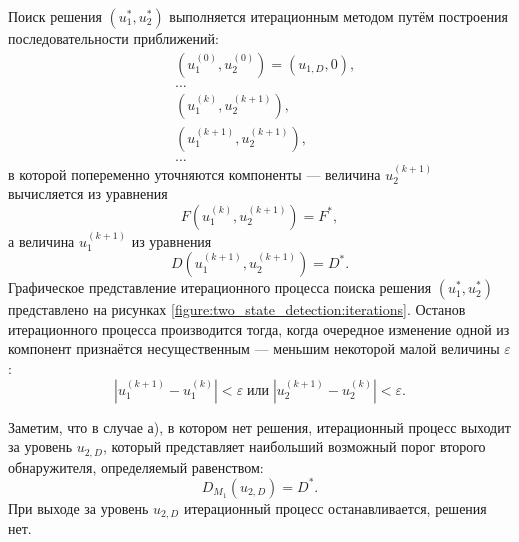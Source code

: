 \documentclass[a4paper,12pt]{article}
\newcommand{\modulus}[1]{\left | #1 \right |}
\begin{document}
    Поиск решения $\left (u_1^*, u_2^* \right )$ выполняется итерационным методом путём построения последовательности приближений:
    \begin{align*}
        & \left ( u_1^{(0)}   , u_2^{(0)} \right ) = \left ( u_{1,D}     , 0 \right ), \\
        & \dots \\
        & \left ( u_1^{(k)}   , u_2^{(k+1)} \right ), \\
        & \left ( u_1^{(k+1)} , u_2^{(k+1)} \right ), \\
        & \dots
    \end{align*}
    в которой попеременно уточняются компоненты --- величина $u_2^{(k+1)}$  вычисляется из уравнения
    \[
        F (u_1^{(k)}, u_2^{(k+1)}) = F^* ,
    \]
    а величина $u_1^{(k+1)}$ из уравнения
    \[
        D (u_1^{(k+1)}, u_2^{(k+1)}) = D^* .
    \]
    Графическое представление итерационного процесса поиска решения $\left ( u_1^*, u_2^* \right )$ представлено на рисунках \ref{figure:two_state_detection:iterations}.
    Останов итерационного процесса производится тогда, когда очередное изменение одной из компонент признаётся несущественным --- меньшим некоторой малой величины $\varepsilon$:
    \[
        \modulus{u_1^{(k+1)} - u_1^{(k)}} < \varepsilon \; \text{или} \; \modulus{u_2^{(k+1)} - u_2^{(k)}} < \varepsilon .
    \]


    Заметим, что в случае а), в котором нет решения, итерационный процесс выходит за уровень $u_{2,D}$, который представляет наибольший возможный порог второго обнаружителя,
    определяемый равенством:
    \[
        D_{M_1} ( u_{2,D} ) = D^* .
    \]
    При выходе за уровень $u_{2,D}$ итерационный процесс останавливается, решения нет.
\end{document}
